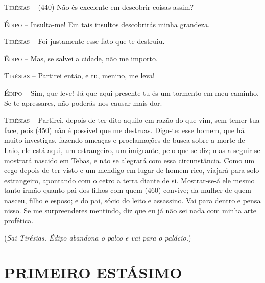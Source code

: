 \textsc{Tirésias} --   (440) Não és excelente em descobrir coisas assim?

\textsc{Édipo} --   Insulta-me! Em tais insultos descobrirás minha grandeza.

\textsc{Tirésias} --   Foi justamente esse fato que te destruiu.

\textsc{Édipo} --   Mas, se salvei a cidade, não me importo.

\textsc{Tirésias} --   Partirei então, e tu, menino, me leva!

\textsc{Édipo} --   Sim, que leve! Já que aqui presente tu és um tormento em meu caminho. Se
te apressares, não poderás nos causar mais dor.

\textsc{Tirésias} --   Partirei, depois de ter dito aquilo em razão do que vim, sem temer tua
face, pois (450) não é possível que me destruas. Digo-te: esse homem,
que há muito investigas, fazendo ameaças e proclamações de busca sobre a
morte de Laio, ele está aqui, um estrangeiro, um imigrante, pelo que se
diz; mas a seguir se mostrará nascido em Tebas, e não se alegrará com
essa circunstância. Como um cego depois de ter visto e um mendigo em
lugar de homem rico, viajará para solo estrangeiro, apontando com o
cetro a terra diante de si. Mostrar-se-á ele mesmo tanto irmão quanto
pai dos filhos com quem (460) convive; da mulher de quem nasceu, filho e
esposo; e do pai, sócio do leito e assassino. Vai para dentro e pensa
nisso. Se me surpreenderes mentindo, diz que eu já não sei nada com
minha arte profética.

(\emph{Sai Tirésias. Édipo abandona o palco e vai para o palácio.})

\section{PRIMEIRO ESTÁSIMO}

